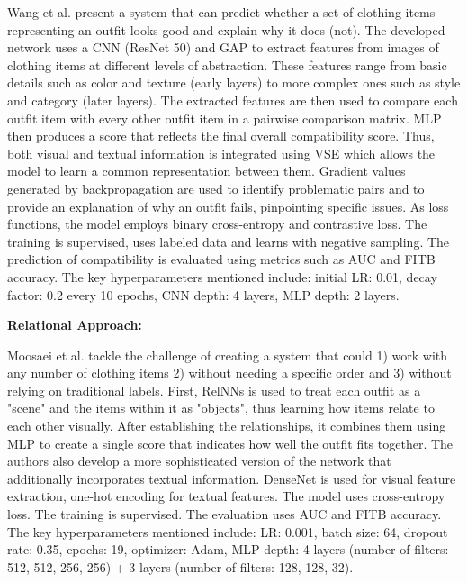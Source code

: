 Wang et al. present a system that can predict whether a set of clothing items representing an outfit looks good and explain why it does (not). The developed network uses a \acs{CNN} (\acs{ResNet} 50) and \acs{GAP} to extract features from images of clothing items at different levels of abstraction. These features range from basic details such as color and texture (early layers) to more complex ones such as style and category (later layers). The extracted features are then used to compare each outfit item with every other outfit item in a pairwise comparison matrix. \acs{MLP} then produces a score that reflects the final overall compatibility score. Thus, both visual and textual information is integrated using \acs{VSE} which allows the model to learn a common representation between them. Gradient values generated by backpropagation are used to identify problematic pairs and to provide an explanation of why an outfit fails, pinpointing specific issues. As loss functions, the model employs binary cross-entropy and contrastive loss. The training is supervised, uses labeled data and learns with negative sampling. The prediction of compatibility is evaluated using metrics such as \acs{AUC} and \acs{FITB} accuracy. The key hyperparameters mentioned include: initial \acs{LR}: 0.01, decay factor: 0.2 every 10 epochs, \acs{CNN} depth: 4 layers, \acs{MLP} depth: 2 layers. \cite[cf.]{wang_outfit_2019}

\vspace{0.5cm}

\textbf{Relational Approach:}

\vspace{0.5cm}

Moosaei et al. tackle the challenge of creating a system that could 1) work with any number of clothing items 2) without needing a specific order and 3) without relying on traditional labels. First, \acs{RelNNs} is used to treat each outfit as a "scene" and the items within it as "objects", thus learning how items relate to each other visually. After establishing the relationships, it combines them using \acs{MLP} to create a single score that indicates how well the outfit fits together. The authors also develop a more sophisticated version of the network that additionally incorporates textual information. DenseNet is used for visual feature extraction, one-hot encoding for textual features. The model uses cross-entropy loss. The training is supervised. The evaluation uses \acs{AUC} and \acs{FITB} accuracy. The key hyperparameters mentioned include: \acs{LR}: 0.001, batch size: 64, dropout rate: 0.35, epochs: 19, optimizer: Adam, \acs{MLP} depth: 4 layers (number of filters: 512, 512, 256, 256) + 3 layers (number of filters: 128, 128, 32). \cite[cf.]{moosaei_fashion_2020}

